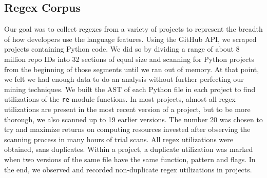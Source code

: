 \subsection{Regex Corpus}
\label{study:corpus}
Our goal was to collect regexes from a variety of projects to represent the breadth of how developers use the language features.
Using the GitHub API, we scraped   projects containing Python code.
We did so  by dividing a range of about 8 million repo IDs 
into 32 sections of equal size and scanning  for Python projects from the beginning of those
segments until we ran out of memory. At that point, we felt we had enough data
to do an analysis without further perfecting our mining techniques. We built
the AST of each Python file in each project to find utilizations of the {\tt re} module
functions. In most projects, almost all regex utilizations are present in the
most recent version of a project, but to be more thorough, we also scanned up
to 19 earlier versions. The number 20 was chosen to try and maximize returns on
computing resources invested after observing the scanning process in many hours
of trial scans.
All regex utilizations were obtained, sans duplicates. Within a project, a duplicate utilization was marked when two versions of the same file have the same function, pattern and flags.  In the end, we observed and recorded  non-duplicate regex utilizations in  projects.

